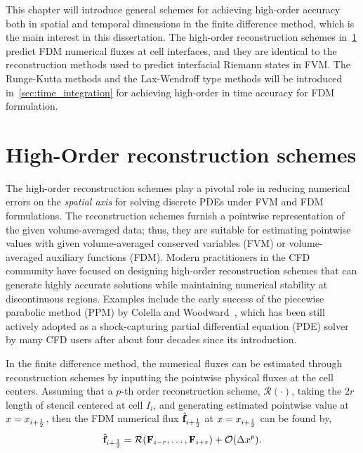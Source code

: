 This chapter will introduce general schemes for achieving high-order accuracy
both in spatial and temporal dimensions in the finite difference method, which is the main interest in this dissertation.
The high-order reconstruction schemes in~\cref{sec:recons} predict FDM numerical fluxes at cell interfaces,
and they are identical to the reconstruction methods used to predict interfacial Riemann states in FVM\@.
The Runge-Kutta methods and the Lax-Wendroff type methods will be introduced in~\cref{sec:time_integration}
for achieving high-order in time accuracy for FDM formulation.


\section{High-Order reconstruction schemes}\label{sec:recons}

The high-order reconstruction schemes play a pivotal role in reducing numerical errors
on the \textit{spatial axis} for solving discrete PDEs under FVM and FDM formulations.
The reconstruction schemes furnish a pointwise representation of the given volume-averaged data;
thus, they are suitable for estimating pointwise values with given volume-averaged conserved variables (FVM) or
volume-averaged auxiliary functions (FDM).
Modern practitioners in the CFD community have focused on designing high-order reconstruction schemes
that can generate highly accurate solutions while maintaining numerical stability at discontinuous regions.
Examples include the early success of the piecewise parabolic method (PPM) by Colella and Woodward~\cite{colella1984piecewise},
which has been still actively adopted as a shock-capturing partial differential equation (PDE) solver
by many CFD users after about four decades since its introduction.

In the finite difference method, the numerical fluxes can be estimated through reconstruction schemes
by inputting the pointwise physical fluxes at the cell centers.
Assuming that a \( p \)-th order reconstruction scheme, \( \mathcal{R}(\cdot) \), taking the \( 2r \) length of stencil
centered at cell \( I_{i} \), and generating estimated pointwise value at \( x = x_{{i+\frac{1}{2}}} \),
then the FDM numerical flux \( \hat{\mathbf{f}}_{{i+\frac{1}{2}}} \) at \( x = x_{{i+\frac{1}{2}}} \) can be found by,
\begin{equation}\label{eq:fdm_recon_1d}
    \hat{\mathbf{f}}_{{i+\frac{1}{2}}} = \mathcal{R}(\mathbf{F}_{i-r}, \dots, \mathbf{F}_{i+r}) + \mathcal{O}(\Delta x^{p}).
\end{equation}

